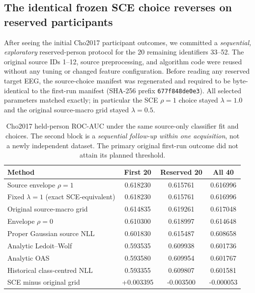 \subsection{The identical frozen SCE choice reverses on reserved participants}
\label{sec:v31b-cho40}
After seeing the initial Cho2017 participant outcomes, we
committed a \emph{sequential, exploratory} reserved-person protocol
for the 20 remaining identifiers 33--52. The original
source IDs 1--12, source preprocessing, and algorithm code
were reused without any tuning or changed feature
configuration. Before reading any reserved target EEG,
the source-choice manifest was regenerated and required
to be byte-identical to the first-run manifest
(SHA-256 prefix \texttt{677f848de0e3}).
All selected parameters matched exactly; in particular
the SCE $\rho=1$ choice stayed $\lambda=1.0$ and the
original source-macro grid stayed $\lambda=0.5$.

\begin{table}[ht]
\centering
\small
\caption{Cho2017 held-person ROC-AUC under the same source-only
classifier fit and choices. The second block is a
\emph{sequential follow-up within one acquisition},
not a newly independent dataset. The primary original
first-run outcome did not attain its planned threshold.}
\label{tab:v31b-cho40}
\begin{tabular}{lccc}
\toprule
Method & First 20 & Reserved 20 & All 40\\
\midrule
Source envelope $\rho=1$ & 0.618230 & 0.615761 & 0.616996\\
Fixed $\lambda=1$ (exact SCE-equivalent) & 0.618230 & 0.615761 & 0.616996\\
Original source-macro grid & 0.614835 & 0.619261 & 0.617048\\
Envelope $\rho=0$ & 0.610300 & 0.618997 & 0.614648\\
Proper Gaussian source NLL & 0.601830 & 0.615487 & 0.608658\\
Analytic Ledoit--Wolf & 0.593535 & 0.609938 & 0.601736\\
Analytic OAS & 0.593580 & 0.609954 & 0.601767\\
Historical class-centred NLL & 0.593355 & 0.609807 & 0.601581\\
\midrule
SCE minus original grid & +0.003395 & -0.003500 & -0.000053\\
\bottomrule
\end{tabular}
\end{table}

